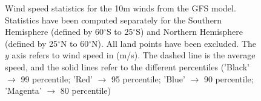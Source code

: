 \documentclass[12pt]{article}
\newcommand{\degree}{^\circ}
\begin{document}
\setcounter{subfigure}{0}
\begin{figure}[t]
\hspace*{0.25in}
\caption{Wind speed statistics for the 10m winds from the GFS model. Statistics have been computed separately for the Southern Hemisphere (defined by 60$\degree$S to 25$\degree$S) and Northern Hemisphere (defined by 25$\degree$N to 60$\degree$N). All land points have been excluded. The $y$ axis refers to wind speed in (m/s). The dashed line is the average speed, and the solid lines refer to the different percentiles ('Black' $\rightarrow$ 99 percentile; 'Red' $\rightarrow$ 95 percentile; 'Blue' $\rightarrow$ 90 percentile; 'Magenta' $\rightarrow$ 80 percentile)}
\label{fig:wind_stats}
\end{figure}
\end{document}
